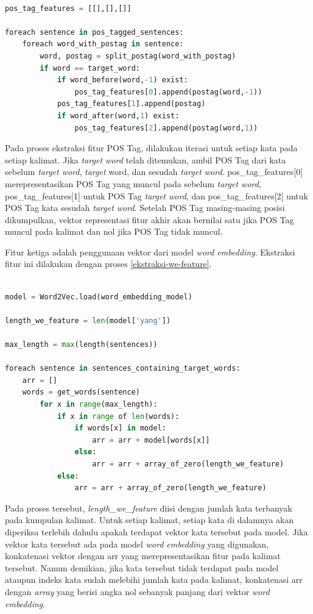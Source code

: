 \begin{lstlisting}[language=python,caption={Ekstraksi Fitur POS Tag}, label={fitur-postag}]

pos_tag_features = [[],[],[]]

foreach sentence in pos_tagged_sentences:
	foreach word_with_postag in sentence:
		word, postag = split_postag(word_with_postag)
		if word == target_word:
			if word_before(word,-1) exist:
				pos_tag_features[0].append(postag(word,-1))
			pos_tag_features[1].append(postag)
			if word_after(word,1) exist:
				pos_tag_features[2].append(postag(word,1))

\end{lstlisting}

Pada proses ekstraksi fitur POS Tag, dilakukan iterasi untuk setiap kata pada setiap kalimat. Jika \textit{target word} telah ditemukan, ambil POS Tag dari kata sebelum \textit{target word}, \textit{target} word, dan sesudah \textit{target word}. pos\_tag\_features[0] merepresentasikan POS Tag yang muncul pada sebelum \textit{target word}, pos\_tag\_features[1] untuk POS Tag \textit{target word}, dan pos\_tag\_features[2] untuk POS Tag kata sesudah \textit{target word}. Setelah POS Tag masing-masing posisi dikumpulkan, vektor representasi fitur akhir akan bernilai satu jika POS Tag muncul pada kalimat dan nol jika POS Tag tidak muncul. 

Fitur ketiga adalah penggunaan vektor dari model \textit{word embedding}. Ekstraksi fitur ini dilakukan dengan proses \ref{ekstraksi-we-feature}.

\begin{lstlisting}[language = python, caption={Ekstraksi fitur \textit{word embedding}}, label={ekstraksi-we-feature}]

model = Word2Vec.load(word_embedding_model)

length_we_feature = len(model['yang'])

max_length = max(length(sentences))

foreach sentence in sentences_containing_target_words:
	arr = []
	words = get_words(sentence)
		for x in range(max_length):
			if x in range of len(words):
				if words[x] in model:
					arr = arr + model[words[x]]
				else:
					arr = arr + array_of_zero(length_we_feature)
			else:
				arr = arr + array_of_zero(length_we_feature)
\end{lstlisting}

Pada proses tersebut, \textit{length\_we\_feature} diisi dengan jumlah kata terbanyak pada kumpulan kalimat. Untuk setiap kalimat, setiap kata di dalamnya akan diperiksa terlebih dahulu apakah terdapat vektor kata tersebut pada model. Jika vektor kata tersebut ada pada model \textit{word embedding} yang digunakan, konkatenasi vektor dengan arr yang merepresentasikan fitur pada kalimat tersebut. Namun demikian, jika kata tersebut tidak terdapat pada model ataupun indeks kata sudah melebihi jumlah kata pada kalimat, konkatenasi arr dengan \textit{array} yang berisi angka nol sebanyak panjang dari vektor \textit{word embedding}.

